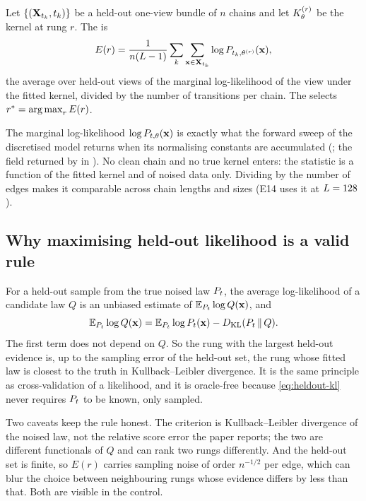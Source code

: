 \begin{definition}
\label{def:evidence}
Let $\{(\mathbf{X}_{t_k},t_k)\}$ be a held-out one-view bundle of $n$ chains and let
$K_{\theta}^{(r)}$ be the kernel at rung $r$. The  is
\begin{equation}
  E(r)=\frac{1}{n(L-1)}\sum_{k}\sum_{\mathbf{x}\in\mathbf{X}_{t_k}}\log P_{t_k,\theta^{(r)}}(\mathbf{x}),
  \label{eq:evidence}
\end{equation}
the average over held-out views of the marginal log-likelihood of the view under the
fitted kernel, divided by the number of transitions per chain. The 
selects $r^\ast=\operatorname*{arg\,max}_rE(r)$.
\end{definition}

The marginal log-likelihood $\log P_{t,\theta}(\mathbf{x})$ is exactly what the forward sweep
of the discretised model returns when its normalising constants are accumulated
(; the field  returned by
 in ). No clean chain and no true kernel enters: the statistic
is a function of the fitted kernel and of noised data only. Dividing by the number of
edges makes it comparable across chain lengths and sizes (E14 uses it at $L=128$).

\subsection{Why maximising held-out likelihood is a valid rule}

For a held-out sample from the true noised law $P_t$, the average log-likelihood of a
candidate law $Q$ is an unbiased estimate of $\mathbb{E}_{P_t}\log Q(\mathbf{x})$, and
\begin{equation}
  \mathbb{E}_{P_t}\log Q(\mathbf{x})=\mathbb{E}_{P_t}\log P_t(\mathbf{x})-D_{\mathrm{KL}}(P_t\,\|\,Q).
  \label{eq:heldout-kl}
\end{equation}
The first term does not depend on $Q$. So the rung with the largest held-out evidence
is, up to the sampling error of the held-out set, the rung whose fitted law is closest
to the truth in Kullback--Leibler divergence. It is the same principle as
cross-validation of a likelihood, and it is oracle-free because \cref{eq:heldout-kl}
never requires $P_t$ to be known, only sampled.

Two caveats keep the rule honest. The criterion is Kullback--Leibler divergence of the
noised law, not the relative score error the paper reports; the two are different
functionals of $Q$ and can rank two rungs differently. And the held-out set is finite,
so $E(r)$ carries sampling noise of order $n^{-1/2}$ per edge, which can blur the choice
between neighbouring rungs whose evidence differs by less than that. Both are visible in
the control.

